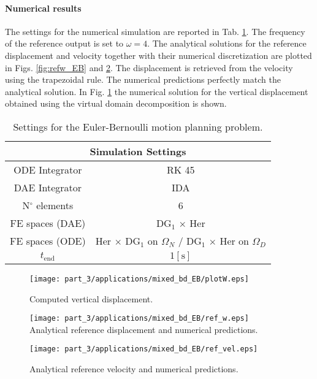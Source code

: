 \paragraph{Numerical results}
The settings for the numerical simulation are reported in Tab. \ref{tab:parEBmotion}. The frequency of the reference output is set to $\omega=4$. The analytical solutions for the reference displacement and velocity together with their numerical discretization are plotted in Figs. \ref{fig:refw_EB} and \ref{fig:refv_EB}. The displacement is retrieved from the velocity using the trapezoidal rule. The numerical predictions perfectly match the analytical solution. In Fig. \ref{fig:w_motplan_EB} the numerical solution for the vertical displacement obtained using the virtual domain decomposition is shown. 

\begin{table}[th]
	\centering
	\begin{tabular}{|c|c|}
		\hline 
		\multicolumn{2}{|c|}{Simulation Settings} \\ 
		\hline 
		ODE Integrator & RK 45\\
		DAE Integrator & IDA \\ 
		N$^\circ$ elements & 6 \\ 
		FE spaces (DAE) & DG$_1$ $\times$ Her \\
		FE spaces (ODE) & Her $\times$ DG$_1$ on $\Omega_N$ / DG$_1$ $\times$ Her on $\Omega_D$ \\
		$t_{\text{end}}$& $1  [\textrm{s}]$ \\ 
		\hline 
	\end{tabular} 
	\vspace{1mm}
	\caption{Settings for the Euler-Bernoulli motion planning problem.}
	\label{tab:parEBmotion}
\end{table}

\begin{figure}[th]
	\centering
	\texttt{[image: part\_3/applications/mixed\_bd\_EB/plotW.eps]} \\
	\caption{Computed vertical displacement.}
	\label{fig:w_motplan_EB}
\end{figure}


\begin{figure}[bth!]
\begin{minipage}[t]{0.5\linewidth}
	\centering
	\texttt{[image: part\_3/applications/mixed\_bd\_EB/ref\_w.eps]} \\
	\caption{Analytical reference displacement and numerical predictions.}
	\label{fig:refw_EB}
\end{minipage}\hspace{0.5cm}
\begin{minipage}[t]{0.5\linewidth}
	\centering
	\texttt{[image: part\_3/applications/mixed\_bd\_EB/ref\_vel.eps]} \\
	\caption{Analytical reference velocity and numerical predictions.}
	\label{fig:refv_EB}
\end{minipage}
\end{figure}

